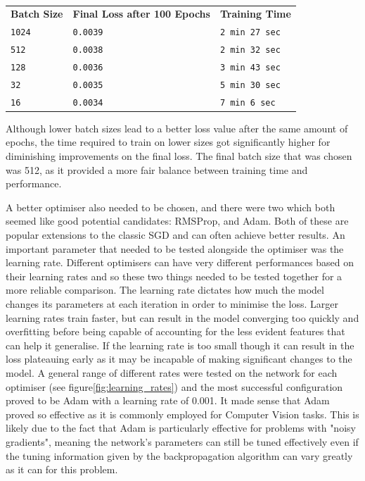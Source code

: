 \documentclass{l4proj}
\begin{document}
\begin{table}[h]
    \centering
    \caption{}
    \label{tab:operators}
    \begin{tabular}{lll}
        \textbf{Batch Size} &   \textbf{Final Loss after 100 Epochs}      &   \textbf{Training Time}  \\    
        \texttt{1024}           &   \texttt{0.0039}                     &   \texttt{2 min 27 sec}    \\
        \texttt{512}            &   \texttt{0.0038}                     &   \texttt{2 min 32 sec}   \\ 
        \texttt{128}            &   \texttt{0.0036}                     &   \texttt{3 min 43 sec}   \\
        \texttt{32}             &   \texttt{0.0035}                     &   \texttt{5 min 30 sec}   \\
        \texttt{16}             &   \texttt{0.0034}                     &   \texttt{7 min 6 sec}    \\
    \end{tabular}
\end{table}

Although lower batch sizes lead to a better loss value after the same amount of epochs, the time required to train on lower sizes got significantly higher for diminishing improvements on the final loss. The final batch size that was chosen was 512, as it provided a more fair balance between training time and performance.

A better optimiser also needed to be chosen, and there were two which both seemed like good potential candidates: RMSProp, and Adam. Both of these are popular extensions to the classic SGD and can often achieve better results. An important parameter that needed to be tested alongside the optimiser was the learning rate. Different optimisers can have very different performances based on their learning rates and so these two things needed to be tested together for a more reliable comparison. The learning rate dictates how much the model changes its parameters at each iteration in order to minimise the loss. Larger learning rates train faster, but can result in the model converging too quickly and overfitting before being capable of accounting for the less evident features that can help it generalise. If the learning rate is too small though it can result in the loss plateauing early as it may be incapable of making significant changes to the model. A general range of different rates were tested on the network for each optimiser (see figure\ref{fig:learning_rates}) and the most successful configuration proved to be Adam with a learning rate of 0.001. It made sense that Adam proved so effective as it is commonly employed for Computer Vision tasks\cite{Adam}. This is likely due to the fact that Adam is particularly effective for problems with "noisy gradients", meaning the network's parameters can still be tuned effectively even if the tuning information given by the backpropagation algorithm can vary greatly as it can for this problem. 
\end{document}
